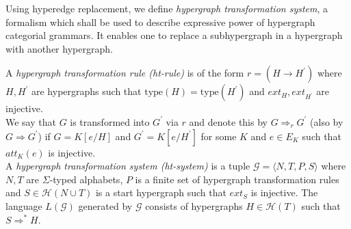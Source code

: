 \documentclass[a4paper,UKenglish,cleveref, autoref, thm-restate,pdfa]{lipics-v2021}
\newcommand{\Gram}{\mathcal{G}}
\newcommand{\att}{\mathit{att}}
\newcommand{\ext}{\mathit{ext}}
\newcommand{\type}{\mathrm{type}}
\newcommand{\HG}{\mathcal{H}}
\begin{document}
Using hyperedge replacement, we define \emph{hypergraph transformation system}, a formalism which shall be used to describe expressive power of hypergraph categorial grammars. It enables one to replace a subhypergraph in a hypergraph with another hypergraph. 
\begin{definition}\label{definition:ht-rule-system}
	A \emph{hypergraph transformation rule (ht-rule)} is of the form $r = (H \to H^\prime)$ where $H,H^\prime$ are hypergraphs such that $\type(H) = \type(H^\prime)$ and $\ext_H,\ext_{H^\prime}$ are injective.
	\\
	We say that $G$ is transformed into $G^\prime$ via $r$ and denote this by $G \Rightarrow_r G^\prime$ (also by $G \Rightarrow G^\prime$) if $G = K[e/H]$ and $G^\prime = K[e/H^\prime]$ for some $K$ and $e \in E_K$ such that $\att_K(e)$ is injective. 
	\\
	A \emph{hypergraph transformation system (ht-system)} is a tuple $\Gram = \langle N,T,P,S\rangle$ where $N,T$ are $\Sigma$-typed alphabets, $P$ is a finite set of hypergraph transformation rules and $S \in \mathcal{H}(N \cup T)$ is a start hypergraph such that $\ext_S$ is injective.
	The language $L(\Gram)$ generated by $\Gram$ consists of hypergraphs $H \in \HG(T)$ such that $S \Rightarrow^\ast H$.
\end{definition}
\end{document}
